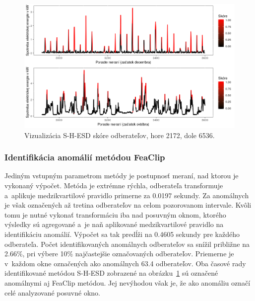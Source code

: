 \documentclass[a4paper,twoside,slovak,12pt,appendix]{article}
\begin{document}
\begin{figure}[htbp]
  \centering
  \includegraphics[width=\textwidth]{results_twitter.png}
  \caption[Vizualizácia S-H-ESD skóre odberateľov.]{Vizualizácia S-H-ESD skóre odberateľov, hore 2172, dole 6536.}
  \label{fig:results-twitter}
\end{figure}

\subsubsection{Identifikácia anomálií metódou FeaClip}
Jediným vstupným parametrom metódy je postupnosť meraní, nad ktorou je vykonaný
výpočet. Metóda je extrémne rýchla, odberateľa transformuje a~aplikuje
medzikvartilové pravidlo primerne za 0.0197 sekundy. Za anomálnych je však
označených až tretina odberateľov na celom pozorovanom intervale. Kvôli tomu je
nutné vykonať transformáciu iba nad posuvným oknom, ktorého výsledky sú
agregované a~je naň aplikované medzikvartilové pravidlo na identifikáciu
anomálií. Výpočet sa tak predĺži na 0.4605 sekundy pre každého odberateľa. Počet
identifikovaných anomálnych odberateľov sa snížil približne na 2.66\%, pri
výbere 10\% najčastejšie označovaných odberateľov. Priemerne je v~každom okne
označených ako anomálnych 63.4 odberateľov. Oba časové rady identifikované
metódou S-H-ESD zobrazené na obrázku~\ref{fig:results-twitter} sú označené
anomálnymi aj FeaClip metódou. Jej nevýhodou však je, že ako anomáliu označí
celé analyzované posuvné okno.
\end{document}
